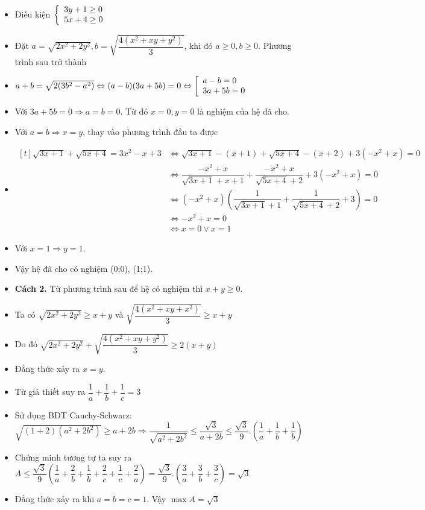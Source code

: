 \lgi 
\begin{itemize}[label=,leftmargin=*]
\item Điều kiện $\left\{\begin{array}{ll}3y+1 \ge 0 \\ 5x+4\ge 0\end{array}\right.$
\item Đặt $a=\sqrt{2x^2+2y^2},b=\sqrt{\dfrac{4(x^2+xy+y^2)}{3}}$, khi đó $a\ge 0, b\ge 0$. Phương trình sau trở thành
\item $a+b=\sqrt{2(3b^2-a^2)}\Leftrightarrow (a-b)(3a+5b)=0 \Leftrightarrow \left[\begin{array}{ll}a-b=0 \\ 3a+5b=0\end{array}\right.$
\item Với $3a+5b=0\Rightarrow a=b=0$. Từ đó $x=0,y=0$ là nghiệm của hệ đã cho.
\item Với $a=b\Rightarrow x=y$, thay vào phương trình đầu ta được 
\item $\begin{aligned}[t]\sqrt{3x+1}+\sqrt{5x+4}=3x^2-x+3 &\Leftrightarrow \sqrt{3x+1}-(x+1)+\sqrt{5x+4}-(x+2)+3(-x^2+x)=0 \\
&\Leftrightarrow \dfrac{-x^2+x}{\sqrt{3x+1}+x+1}+\dfrac{-x^2+x}{\sqrt{5x+4}+2}+3(-x^2+x)=0 \\
&\Leftrightarrow (-x^2+x)\left(\dfrac{1}{\sqrt{3x+1}+1}+\dfrac{1}{\sqrt{5x+4}+2}+3 \right) =0 \\
&\Leftrightarrow -x^2+x=0 \\
&\Leftrightarrow x=0 \vee x=1\end{aligned}$
\item Với $x=1\Rightarrow y=1$.
\item Vậy hệ đã cho có nghiệm (0;0), (1;1).
\item \textbf{Cách 2.} Từ phương trình sau để hệ có nghiệm thì $x+y\ge 0$.
\item Ta có $\sqrt{2x^2+2y^2}\ge x+y$ và $\sqrt{\dfrac{4(x^2+xy+x^2)}{3}}\ge x+y$
\item Do đó $ \sqrt{2x^2+2y^2}+\sqrt{\dfrac{4(x^2+xy+y^2)}{3}}\ge 2(x+y)$
\item Đẳng thức xảy ra $x=y$.
\end{itemize}

\lgi 
\begin{itemize}[label=,leftmargin=*]
\item Từ giả thiết suy ra $\dfrac{1}{a}+\dfrac{1}{b}+\dfrac{1}{c}=3$
\item Sử dụng BĐT Cauchy-Schwarz: $\sqrt{(1+2)(a^2+2b^2)}\ge a+2b\Rightarrow \dfrac{1}{\sqrt{a^2+2b^2}}\le \dfrac{\sqrt{3}}{a+2b}\le \dfrac{\sqrt{3}}{9}.\left(\dfrac{1}{a}+\dfrac{1}{b}+\dfrac{1}{b} \right)$
\item Chứng minh tương tự ta suy ra $A\le \dfrac{\sqrt{3}}{9}\left(\dfrac{1}{a}+\dfrac{2}{b}+\dfrac{1}{b}+\dfrac{2}{c}+\dfrac{1}{c}+\dfrac{2}{a}\right)=\dfrac{\sqrt{3}}{9}.\left(\dfrac{3}{a}+\dfrac{3}{b}+\dfrac{3}{c}\right)=\sqrt{3}$
\item Đẳng thức xảy ra khi $a=b=c=1$. Vậy $\max A=\sqrt{3}$
\end{itemize}

